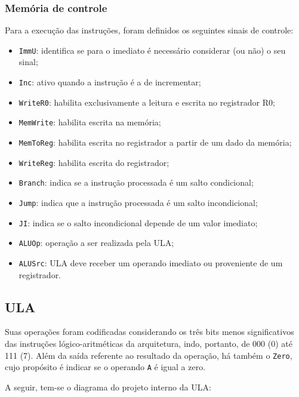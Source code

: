 \documentclass[twocolumn, 11pt]{article}
\begin{document}
\subsubsection{Memória de controle}

Para a execução das instruções, foram definidos os seguintes sinais de controle:

\begin{itemize}
    \item \texttt{ImmU}: identifica se para o imediato é necessário considerar (ou não) o seu sinal;
    \item \texttt{Inc}: ativo quando a instrução é a de incrementar;
    \item \texttt{WriteR0}: habilita exclusivamente a leitura e escrita no registrador R0;
    \item \texttt{MemWrite}: habilita escrita na memória;
    \item \texttt{MemToReg}: habilita escrita no registrador a partir de um dado da memória;
    \item \texttt{WriteReg}: habilita escrita do registrador; 
    \item \texttt{Branch}: indica se a instrução processada é um salto condicional;
    \item \texttt{Jump}: indica que a instrução processada é um salto incondicional;
    \item \texttt{JI}: indica se o salto incondicional depende de um valor imediato;
    \item \texttt{ALUOp}: operação a ser realizada pela ULA; 
    \item \texttt{ALUSrc}: ULA deve receber um operando imediato ou proveniente de um registrador.
\end{itemize}

\subsection{ULA}

Suas operações foram codificadas considerando os três bits menos significativos das instruções lógico-aritméticas da arquitetura, indo, portanto, de 000 (0) até 111 (7). Além da saída referente ao resultado da operação, há também o \texttt{Zero}, cujo propósito é indicar se o operando \texttt{A} é igual a zero.

A seguir, tem-se o diagrama do projeto interno da ULA:
\end{document}
